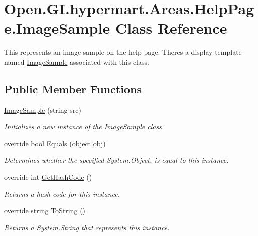 \hypertarget{class_open_1_1_g_i_1_1hypermart_1_1_areas_1_1_help_page_1_1_image_sample}{}\section{Open.\+G\+I.\+hypermart.\+Areas.\+Help\+Page.\+Image\+Sample Class Reference}
\label{class_open_1_1_g_i_1_1hypermart_1_1_areas_1_1_help_page_1_1_image_sample}


This represents an image sample on the help page. There\textquotesingle{}s a display template named \hyperlink{class_open_1_1_g_i_1_1hypermart_1_1_areas_1_1_help_page_1_1_image_sample}{Image\+Sample} associated with this class.  


\subsection*{Public Member Functions}
\begin{DoxyCompactItemize}
\item 
\hyperlink{class_open_1_1_g_i_1_1hypermart_1_1_areas_1_1_help_page_1_1_image_sample_a3570ac8793e478a72e64041784f39120}{Image\+Sample} (string src)
\begin{DoxyCompactList}\small\item\em Initializes a new instance of the \hyperlink{class_open_1_1_g_i_1_1hypermart_1_1_areas_1_1_help_page_1_1_image_sample}{Image\+Sample} class. \end{DoxyCompactList}\item 
override bool \hyperlink{class_open_1_1_g_i_1_1hypermart_1_1_areas_1_1_help_page_1_1_image_sample_a51e16a01c4f9a5a568c82d1f2d093337}{Equals} (object obj)
\begin{DoxyCompactList}\small\item\em Determines whether the specified System.\+Object, is equal to this instance. \end{DoxyCompactList}\item 
override int \hyperlink{class_open_1_1_g_i_1_1hypermart_1_1_areas_1_1_help_page_1_1_image_sample_a3374507c967e37d7fcba28ec9481865b}{Get\+Hash\+Code} ()
\begin{DoxyCompactList}\small\item\em Returns a hash code for this instance. \end{DoxyCompactList}\item 
override string \hyperlink{class_open_1_1_g_i_1_1hypermart_1_1_areas_1_1_help_page_1_1_image_sample_a704782de956313701ca9e6e61692d433}{To\+String} ()
\begin{DoxyCompactList}\small\item\em Returns a System.\+String that represents this instance. \end{DoxyCompactList}\end{DoxyCompactItemize}
